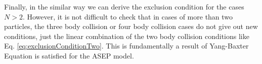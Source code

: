 \documentclass[12pt,a4paper]{article}
\begin{document}
Finally, in the similar way we can derive the exclusion condition for the cases $N>2$. However, it is not difficult to check that in cases of more than two particles, the three body collision or four body collision cases do not give out new conditions, just the linear combination of the two body collision conditions like Eq. \eqref{eq:exclusionConditionTwo}. This is fundamentally a result of Yang-Baxter Equation is satisfied for the ASEP model.

% 
 
\end{document}
